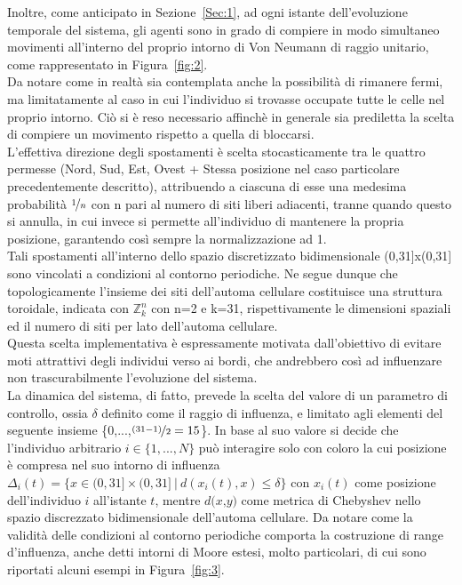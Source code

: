 \documentclass{article}
\newcommand{\Zn}{$\mathbb{Z}^n_k$ } %
\begin{document}
Inoltre, come anticipato in Sezione~\ref{Sec:1}, ad ogni istante dell’evoluzione temporale del sistema, gli agenti sono in grado di compiere in modo simultaneo movimenti all'interno del proprio intorno di Von Neumann di raggio unitario, come rappresentato in Figura~\ref{fig:2}.
\\ Da notare come in realtà sia contemplata anche la possibilità di rimanere fermi, ma limitatamente al caso in cui l'individuo si trovasse occupate tutte le celle nel proprio intorno. Ciò si è reso necessario affinchè in generale sia prediletta la scelta di compiere un movimento rispetto a quella di bloccarsi.
\\ L'effettiva direzione degli spostamenti è scelta stocasticamente tra le quattro permesse (Nord, Sud, Est, Ovest + Stessa posizione nel caso particolare precedentemente descritto), attribuendo a ciascuna di esse una medesima probabilità $\nicefrac{1}{n}$ con n pari al numero di siti liberi adiacenti, tranne quando questo si annulla, in cui invece si permette all’individuo di mantenere la propria posizione, garantendo così sempre la normalizzazione ad 1.
\\ Tali spostamenti all’interno dello spazio discretizzato bidimensionale (0,31]x(0,31] sono vincolati a condizioni al contorno periodiche. Ne segue dunque che topologicamente l’insieme dei siti dell’automa cellulare costituisce una struttura toroidale, indicata con \Zn con n=2 e k=31, rispettivamente le dimensioni spaziali ed il numero di siti per lato dell'automa cellulare.
\\ Questa scelta implementativa è espressamente motivata dall’obiettivo di evitare moti attrattivi degli individui verso ai bordi, che andrebbero così ad influenzare non trascurabilmente l’evoluzione del sistema.
\\ La dinamica del sistema, di fatto, prevede la scelta del valore di un parametro di controllo, ossia $\delta$ definito come il raggio di influenza, e limitato agli elementi del seguente insieme \{0,...,$\nicefrac{(31-1)}{2}=15$\}. In base al suo valore si decide che l'individuo arbitrario $\textit{i} \in \{1,...,\textit{N} \}$ può interagire solo con coloro la cui posizione è compresa nel suo intorno di influenza $\Delta_{i}(t) = \{ x \in (0,31] \times (0,31] \ | \ d(x_{i}(t),x)\leqslant \delta \}$ con $\textit{$x_{i}$}(t)$ come posizione dell'individuo $\textit{i}$ all'istante $\textit{t}$, mentre $\textit{d(x,y)}$ come metrica di Chebyshev nello spazio discrezzato bidimensionale dell'automa cellulare. Da notare come la validità delle condizioni al contorno periodiche comporta la costruzione di range d'influenza, anche detti intorni di Moore estesi, molto particolari, di cui sono riportati alcuni esempi in Figura~\ref{fig:3}.
\end{document}
